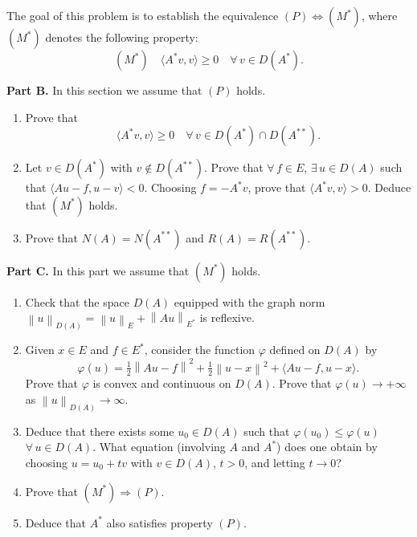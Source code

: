 \documentclass[12pt]{article}
\newcommand{\norm}[1]{\left\|#1\right\|}
\newcommand{\ip}[2]{\langle #1, #2 \rangle}
\begin{document}
\medskip
 
\noindent The goal of this problem is to establish the equivalence $(P) \Leftrightarrow (M^*)$, where $(M^*)$
denotes the following property:
\[
(M^*)\quad \ip{A^* v}{v} \ge 0 \quad \forall\, v \in D(A^*).
\]
 
\noindent\textbf{Part B.} In this section we assume that $(P)$ holds.
 
\begin{enumerate}
\item Prove that
\[
\ip{A^* v}{v} \ge 0 \quad \forall\, v \in D(A^*) \cap D(A^{**}).
\]
 
\item Let $v \in D(A^*)$ with $v \notin D(A^{**})$. Prove that $\forall\, f \in E$, $\exists\, u \in D(A)$ such that
$\ip{Au - f}{u - v} < 0$.
Choosing $f = -A^* v$, prove that $\ip{A^* v}{v} > 0$. Deduce that $(M^*)$ holds.
 
\item Prove that $N(A) = N(A^{**})$ and $R(A) = R(A^{**})$.
\end{enumerate}
 
\noindent\textbf{Part C.} In this part we assume that $(M^*)$ holds.
 
\begin{enumerate}
\item Check that the space $D(A)$ equipped with the graph norm
$\norm{u}_{D(A)} = \norm{u}_E + \norm{Au}_{E^*}$ is reflexive.
 
\item Given $x \in E$ and $f \in E^*$, consider the function $\varphi$ defined on $D(A)$ by
\[
\varphi(u) = \tfrac{1}{2}\norm{Au - f}^2 + \tfrac{1}{2}\norm{u - x}^2 + \ip{Au - f}{u - x}.
\]
Prove that $\varphi$ is convex and continuous on $D(A)$.
Prove that $\varphi(u) \to +\infty$ as $\norm{u}_{D(A)} \to \infty$.
 
\item Deduce that there exists some $u_0 \in D(A)$ such that $\varphi(u_0) \le \varphi(u)$ $\forall\, u \in D(A)$.
What equation (involving $A$ and $A^*$) does one obtain by choosing $u = u_0 + tv$
with $v \in D(A)$, $t > 0$, and letting $t \to 0$?
 
 
\item Prove that $(M^*) \Rightarrow (P)$.
 
\item Deduce that $A^*$ also satisfies property $(P)$.
\end{enumerate}
 
\end{document}

